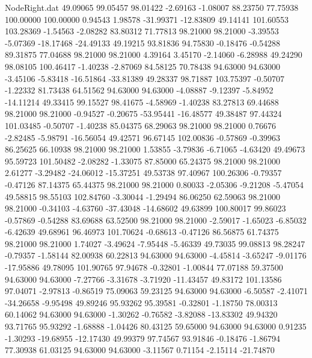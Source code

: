 \begin{filecontents}{NodeRight.dat}
  49.09065   99.05457   98.01422    -2.69163   -1.08007   88.23750   77.75938  100.00000  100.00000    0.94543    1.98578  -31.99371  -12.83809
  49.14141  101.60553  103.28369    -1.54563   -2.08282   83.80312   71.77813   98.21000   98.21000   -3.39553   -5.07369  -18.17468  -24.49133
  49.19215   93.81836   94.75830    -0.18476   -0.54288   89.31875   77.04688   98.21000   98.21000    4.39164    3.45170   -2.14060   -6.28988
  49.24290   98.08105  100.46417    -1.40238   -2.87069   84.58125   70.78438   94.63000   94.63000   -3.45106   -5.83418  -16.51864  -33.81389
  49.28337   98.71887  103.75397    -0.50707   -1.22332   81.73438   64.51562   94.63000   94.63000   -4.08887   -9.12397   -5.84952  -14.11214
  49.33415   99.15527   98.41675    -4.58969   -1.40238   83.27813   69.44688   98.21000   98.21000   -0.94527   -0.20675  -53.95441  -16.48577
  49.38487   97.44324  101.03485    -0.50707   -1.40238   85.04375   68.29063   98.21000   98.21000    0.76676   -2.82485   -5.98791  -16.56054
  49.42571   96.67145  102.00836    -0.57869   -0.39963   86.25625   66.10938   98.21000   98.21000    1.53855   -3.79836   -6.71065   -4.63420
  49.49673   95.59723  101.50482    -2.08282   -1.33075   87.85000   65.24375   98.21000   98.21000    2.61277   -3.29482  -24.06012  -15.37251
  49.53738   97.40967  100.26306    -0.79357   -0.47126   87.14375   65.44375   98.21000   98.21000    0.80033   -2.05306   -9.21208   -5.47054
  49.58815   98.55103  102.84760    -3.30044   -1.29494   86.06250   62.59063   98.21000   98.21000   -0.34103   -4.63760  -37.43048  -14.68602
  49.63899  100.80017   99.86023    -0.57869   -0.54288   83.69688   63.52500   98.21000   98.21000   -2.59017   -1.65023   -6.85032   -6.42639
  49.68961   96.46973  101.70624    -0.68613   -0.47126   86.56875   61.74375   98.21000   98.21000    1.74027   -3.49624   -7.95448   -5.46339
  49.73035   99.08813   98.28247    -0.79357   -1.58144   82.00938   60.22813   94.63000   94.63000   -4.45814   -3.65247   -9.01176  -17.95886
  49.78095  101.90765   97.94678    -0.32801   -1.00844   77.07188   59.37500   94.63000   94.63000   -7.27766   -3.31678   -3.71920  -11.43457
  49.83172  101.13586   97.04071    -2.97813   -0.86519   75.09063   59.23125   94.63000   94.63000   -6.50587   -2.41071  -34.26658   -9.95498
  49.89246   95.93262   95.39581    -0.32801   -1.18750   78.00313   60.14062   94.63000   94.63000   -1.30262   -0.76582   -3.82088  -13.83302
  49.94320   93.71765   95.93292    -1.68888   -1.04426   80.43125   59.65000   94.63000   94.63000    0.91235   -1.30293  -19.68955  -12.17430
  49.99379   97.74567   93.91846    -0.18476   -1.86794   77.30938   61.03125   94.63000   94.63000   -3.11567    0.71154   -2.15114  -21.74870

\end{filecontents}
